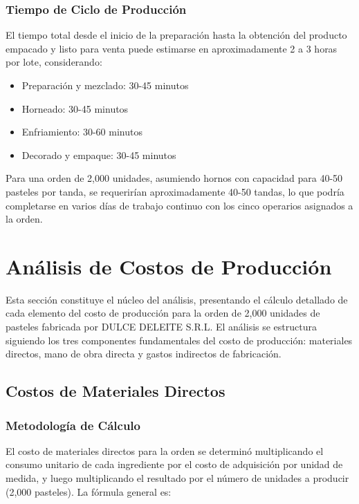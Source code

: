 \documentclass[
  stu,
  floatsintext,
  longtable,
  a4paper,
  nolmodern,
  notxfonts,
  notimes,
  12pt,
  colorlinks=true,linkcolor=blue,citecolor=blue,urlcolor=blue]{apa7}
\providecommand{\tightlist}{%
  \setlength{\itemsep}{0pt}\setlength{\parskip}{0pt}}
\begin{document}
\subsubsection{Tiempo de Ciclo de
Producción}\label{tiempo-de-ciclo-de-producciuxf3n}

El tiempo total desde el inicio de la preparación hasta la obtención del
producto empacado y listo para venta puede estimarse en aproximadamente
2 a 3 horas por lote, considerando:

\begin{itemize}
\tightlist
\item
  Preparación y mezclado: 30-45 minutos
\item
  Horneado: 30-45 minutos
\item
  Enfriamiento: 30-60 minutos
\item
  Decorado y empaque: 30-45 minutos
\end{itemize}

Para una orden de 2,000 unidades, asumiendo hornos con capacidad para
40-50 pasteles por tanda, se requerirían aproximadamente 40-50 tandas,
lo que podría completarse en varios días de trabajo continuo con los
cinco operarios asignados a la orden.

\section{Análisis de Costos de
Producción}\label{anuxe1lisis-de-costos-de-producciuxf3n}

Esta sección constituye el núcleo del análisis, presentando el cálculo
detallado de cada elemento del costo de producción para la orden de
2,000 unidades de pasteles fabricada por DULCE DELEITE S.R.L. El
análisis se estructura siguiendo los tres componentes fundamentales del
costo de producción: materiales directos, mano de obra directa y gastos
indirectos de fabricación.

\subsection{Costos de Materiales
Directos}\label{costos-de-materiales-directos}

\subsubsection{Metodología de
Cálculo}\label{metodologuxeda-de-cuxe1lculo}

El costo de materiales directos para la orden se determinó multiplicando
el consumo unitario de cada ingrediente por el costo de adquisición por
unidad de medida, y luego multiplicando el resultado por el número de
unidades a producir (2,000 pasteles). La fórmula general es:
\end{document}
